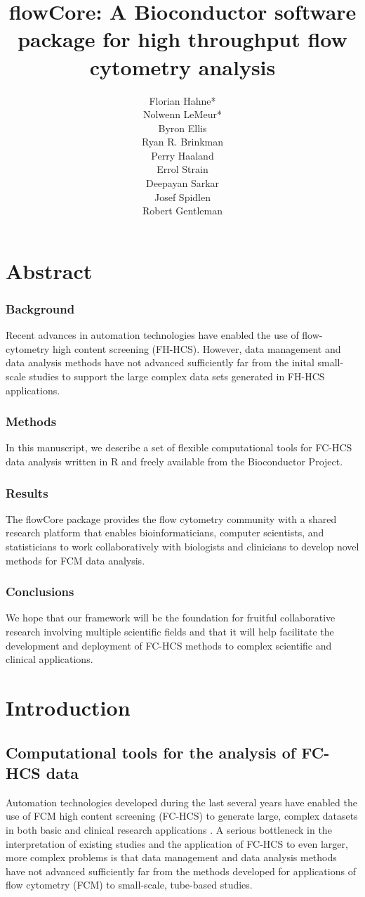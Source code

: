 \documentclass[12pt]{article}
\title{flowCore: A Bioconductor software package for high throughput flow cytometry analysis}
\author{Florian Hahne*\\
  Nolwenn LeMeur*\\
  Byron Ellis\\
  Ryan R. Brinkman\\
  Perry Haaland\\
  Errol Strain\\
  Deepayan Sarkar\\
  Josef Spidlen\\
  Robert Gentleman
 }
\newcommand{\Rpackage}[1]{{\textsf{#1}}}
\begin{document}
\maketitle

\section*{Abstract}
\subsubsection*{Background}
Recent advances in automation technologies have enabled the use of
flow-cytometry high content screening (FH-HCS). However, data
management and data analysis methods have not advanced sufficiently
far from the inital small-scale studies to support the large complex
data sets generated in FH-HCS applications.
\subsubsection*{Methods}
In this manuscript, we describe a set of flexible
computational tools for FC-HCS data analysis written 
in R and freely available from the Bioconductor Project.

\subsubsection*{Results}
The \Rpackage{flowCore} package provides the flow cytometry community
with a shared research platform that enables bioinformaticians,
computer scientists, and statisticians to work collaboratively with
biologists and clinicians to develop novel methods for FCM data
analysis.
\subsubsection*{Conclusions}
We hope that our framework will be the foundation for fruitful 
collaborative research involving multiple scientific fields and
that it will help facilitate the
development and deployment of FC-HCS methods to complex 
scientific and clinical applications.

\section*{Introduction}
\subsection*{Computational tools for the analysis of FC-HCS data}
Automation technologies developed during the last several years have
enabled the use of FCM high content screening (FC-HCS) to generate
large, complex datasets in both basic and clinical research
applications \citep{brinkman2007hcf}. A serious bottleneck in the
interpretation of existing studies and the application of FC-HCS to
even larger, more complex problems is that data management and data
analysis methods have not advanced sufficiently far from the methods
developed for applications of flow cytometry (FCM) to small-scale,
tube-based studies.
\end{document}
